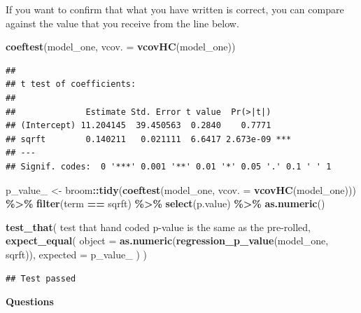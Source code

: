 \documentclass[
]{book}
\newenvironment{Shaded}{\begin{snugshade}}{\end{snugshade}}
\newcommand{\AttributeTok}[1]{\textcolor[rgb]{0.13,0.29,0.53}{#1}}
\newcommand{\FunctionTok}[1]{\textcolor[rgb]{0.13,0.29,0.53}{\textbf{#1}}}
\newcommand{\NormalTok}[1]{#1}
\newcommand{\OtherTok}[1]{\textcolor[rgb]{0.56,0.35,0.01}{#1}}
\newcommand{\SpecialCharTok}[1]{\textcolor[rgb]{0.81,0.36,0.00}{\textbf{#1}}}
\newcommand{\StringTok}[1]{\textcolor[rgb]{0.31,0.60,0.02}{#1}}
\theoremstyle{definition}
\theoremstyle{definition}
\theoremstyle{definition}
\theoremstyle{definition}
\theoremstyle{remark}
\begin{document}
If you want to confirm that what you have written is correct, you can compare against
the value that you receive from the line below.

\begin{Shaded}
\begin{Highlighting}[]
\FunctionTok{coeftest}\NormalTok{(model\_one, }\AttributeTok{vcov. =} \FunctionTok{vcovHC}\NormalTok{(model\_one))}
\end{Highlighting}
\end{Shaded}

\begin{verbatim}
## 
## t test of coefficients:
## 
##              Estimate Std. Error t value  Pr(>|t|)    
## (Intercept) 11.204145  39.450563  0.2840    0.7771    
## sqrft        0.140211   0.021111  6.6417 2.673e-09 ***
## ---
## Signif. codes:  0 '***' 0.001 '**' 0.01 '*' 0.05 '.' 0.1 ' ' 1
\end{verbatim}

\begin{Shaded}
\begin{Highlighting}[]
\NormalTok{p\_value\_ }\OtherTok{\textless{}{-}}\NormalTok{ broom}\SpecialCharTok{::}\FunctionTok{tidy}\NormalTok{(}\FunctionTok{coeftest}\NormalTok{(model\_one, }\AttributeTok{vcov. =} \FunctionTok{vcovHC}\NormalTok{(model\_one))) }\SpecialCharTok{\%\textgreater{}\%} 
  \FunctionTok{filter}\NormalTok{(term }\SpecialCharTok{==} \StringTok{\textquotesingle{}sqrft\textquotesingle{}}\NormalTok{) }\SpecialCharTok{\%\textgreater{}\%} 
  \FunctionTok{select}\NormalTok{(}\StringTok{\textquotesingle{}p.value\textquotesingle{}}\NormalTok{) }\SpecialCharTok{\%\textgreater{}\%} 
  \FunctionTok{as.numeric}\NormalTok{()}

\FunctionTok{test\_that}\NormalTok{(}
  \StringTok{\textquotesingle{}test that hand coded p{-}value is the same as the pre{-}rolled\textquotesingle{}}\NormalTok{, }
  \FunctionTok{expect\_equal}\NormalTok{(}
    \AttributeTok{object   =} \FunctionTok{as.numeric}\NormalTok{(}\FunctionTok{regression\_p\_value}\NormalTok{(model\_one, }\StringTok{\textquotesingle{}sqrft\textquotesingle{}}\NormalTok{)), }
    \AttributeTok{expected =}\NormalTok{ p\_value\_}
\NormalTok{  )}
\NormalTok{)}
\end{Highlighting}
\end{Shaded}

\begin{verbatim}
## Test passed
\end{verbatim}

\textbf{Questions}
\end{document}
